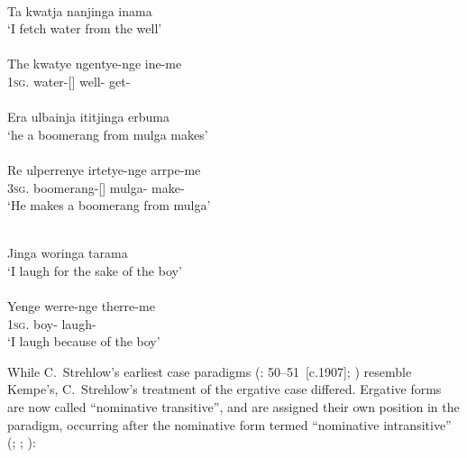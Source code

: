 \ea
\begin{xlist}
 \\
{Ta              kwatja     nanjinga          inama}\\
\glt `I fetch water from the well' \\
                \citep[3]{kempe_grammar_1891}\\
\gll     The          kwatye      ngentye-nge   ine-me\\
1\textsc{sg}.    water-[]    well-        get-\\

 \\
      {Era           ulbainja          ititjinga         erbuma}\\
\glt `he a boomerang from mulga makes' \\
                \citep[3]{kempe_grammar_1891} \\
\gll Re                ulperrenye irtetye-nge     arrpe-me\footnotemark\\
3\textsc{sg}.    boomerang-[]     mulga-   make-\\
\glt `He makes a boomerang from mulga'

 \\
{Jinga        woringa     tarama}\\
\glt `I laugh for the sake of the boy' \\
                \citep[3]{kempe_grammar_1891}\\
\gll Yenge        werre-nge    therre-me\\
1\textsc{sg}.    boy-     laugh-\\
\glt `I laugh because of the boy'
\end{xlist}
\z

While C.~Strehlow’s earliest case paradigms (\citeyear{strehlow_untitled_1931}: 50--51~[c.1907]; ) resemble Kempe’s, C.~Strehlow’s treatment of the ergative case differed. Ergative forms are now called ``nominative transitive'', and are assigned their own position in the paradigm, occurring after the nominative form termed “nominative intransitive” (; ; ):


